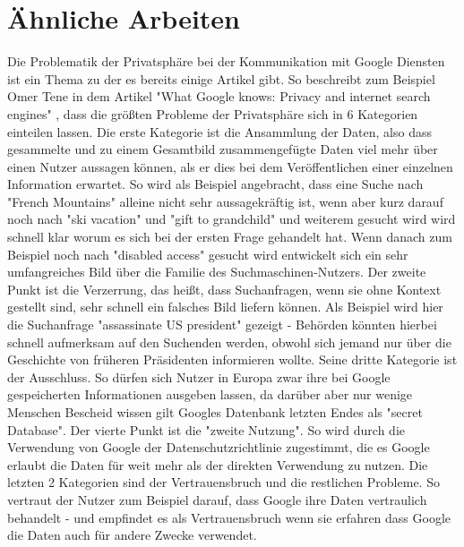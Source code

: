 % 
% 

\chapter{Ähnliche Arbeiten}
Die Problematik der Privatsphäre bei der Kommunikation mit Google Diensten ist ein Thema zu der es bereits einige Artikel gibt. So beschreibt zum Beispiel Omer Tene in dem Artikel "What Google knows: Privacy and internet search engines" \cite{tene2007google}, dass die größten Probleme der Privatsphäre sich in 6 Kategorien einteilen lassen. Die erste Kategorie ist die Ansammlung der Daten, also dass gesammelte und zu einem Gesamtbild zusammengefügte Daten viel mehr über einen Nutzer aussagen können, als er dies bei dem Veröffentlichen einer einzelnen Information erwartet. So wird als Beispiel angebracht, dass eine Suche nach "French Mountains" alleine nicht sehr aussagekräftig ist, wenn aber kurz darauf noch nach "ski vacation" und "gift to grandchild" und weiterem gesucht wird wird schnell klar worum es sich bei der ersten Frage gehandelt hat. Wenn danach zum Beispiel noch nach "disabled access" gesucht wird entwickelt sich ein sehr umfangreiches Bild über die Familie des Suchmaschinen-Nutzers. Der zweite Punkt ist die Verzerrung, das heißt, dass Suchanfragen, wenn sie ohne Kontext gestellt sind, sehr schnell ein falsches Bild liefern können. Als Beispiel wird hier die Suchanfrage "assassinate US president" gezeigt - Behörden könnten hierbei schnell aufmerksam auf den Suchenden werden, obwohl sich jemand nur über die Geschichte von früheren Präsidenten informieren wollte. Seine dritte Kategorie ist der Ausschluss. So dürfen sich Nutzer in Europa zwar ihre bei Google gespeicherten Informationen ausgeben lassen, da darüber aber nur wenige Menschen Bescheid wissen gilt Googles Datenbank letzten Endes als "secret Database". Der vierte Punkt ist die "zweite Nutzung". So wird durch die Verwendung von Google der Datenschutzrichtlinie zugestimmt, die es Google erlaubt die Daten für weit mehr als der direkten Verwendung zu nutzen. Die letzten 2 Kategorien sind der Vertrauensbruch und die restlichen Probleme. So vertraut der Nutzer zum Beispiel darauf, dass Google ihre Daten vertraulich behandelt - und empfindet es als Vertrauensbruch wenn sie erfahren dass Google die Daten auch für andere Zwecke verwendet.

